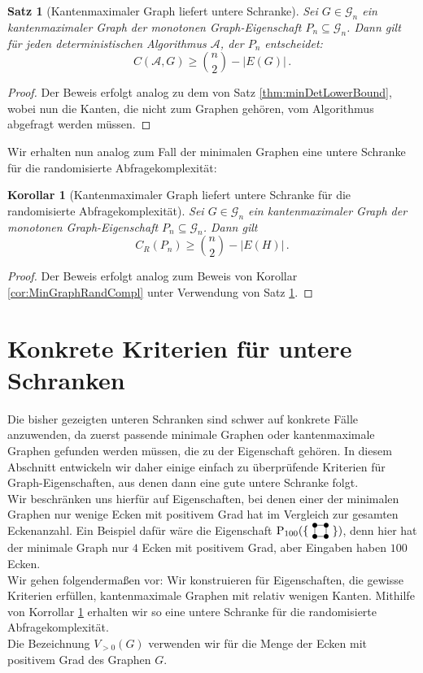 \documentclass[10pt,a4paper]{scrreprt}
\newtheorem{Satz}[definition]{Satz}
\newtheorem{corollary}[definition]{Korollar}
\theoremstyle{definition}
\newcommand{\Square}{
\begin{tikzpicture}[main_node/.style={circle,fill=black},
inner sep=1.5pt, baseline=2pt]

    \node[main_node] (1) at (0,0) {};
    \node[main_node] (2) at (0.35, 0)  {};
    \node[main_node] (3) at (0.35, 0.35) {};
    \node[main_node] (4) at (0, 0.35) {};

    \draw (1) -- (2) -- (3) -- (4) -- (1);
\end{tikzpicture}
}
\begin{document}
\begin{Satz}[Kantenmaximaler Graph liefert untere Schranke]
\label{thm:EdgeMaxGraphLowerBound}
Sei $G\in \mathcal{G}_n$ ein kantenmaximaler Graph der monotonen
Graph-Eigenschaft $P_n \subseteq \mathcal{G}_n$.
Dann gilt für jeden deterministischen Algorithmus $\mathcal{A}$,
der $P_n$ entscheidet: 
$$ C(\mathcal{A}, G) \geq \binom{n}{2} - |E(G)|\,.$$
\end{Satz}
\begin{proof}
Der Beweis erfolgt analog zu dem von Satz \ref{thm:minDetLowerBound},
wobei nun die Kanten, die nicht zum Graphen gehören, vom Algorithmus
abgefragt werden müssen.
\end{proof}
Wir erhalten nun analog zum Fall der minimalen Graphen eine untere
Schranke für die randomisierte Abfragekomplexität:
\begin{corollary} [Kantenmaximaler Graph liefert untere Schranke
für die randomisierte Abfragekomplexität]
\label{thm:EdgeMaximalRandCompl}
Sei $G\in\mathcal{G}_n$ ein kantenmaximaler Graph der monotonen
Graph-Eigenschaft $P_n \subseteq \mathcal{G}_n$.
Dann gilt
$$ C_R(P_n) \geq \binom{n}{2} - |E(H)|\,.$$
\end{corollary}
\begin{proof}
Der Beweis erfolgt analog zum Beweis von Korollar \ref{cor:MinGraphRandCompl}
unter Verwendung von Satz \ref{thm:EdgeMaxGraphLowerBound}.
\end{proof}

\section{Konkrete Kriterien für untere Schranken}
Die bisher gezeigten unteren Schranken sind schwer auf konkrete
Fälle anzuwenden, da zuerst passende minimale Graphen oder kantenmaximale
Graphen gefunden werden müssen, die zu der Eigenschaft gehören.
In diesem Abschnitt entwickeln wir daher einige einfach zu überprüfende
Kriterien für Graph-Eigenschaften, aus denen dann eine gute
untere Schranke folgt. \\
Wir beschränken uns hierfür auf Eigenschaften, bei denen einer
der minimalen Graphen nur wenige Ecken mit positivem Grad hat
im Vergleich zur gesamten Eckenanzahl. Ein Beispiel dafür wäre
die Eigenschaft $\operatorname{P}_{100}(\{ \ \Square \ \})$,
denn hier hat der minimale Graph nur $4$ Ecken mit positivem
Grad, aber Eingaben haben $100$ Ecken. \\
Wir gehen folgendermaßen vor: Wir konstruieren für Eigenschaften,
die gewisse Kriterien erfüllen, kantenmaximale Graphen mit 
relativ wenigen Kanten. Mithilfe von Korrollar 
\ref{thm:EdgeMaximalRandCompl} erhalten wir so eine untere Schranke
für die randomisierte Abfragekomplexität. \\
Die Bezeichnung $V_{>0}(G)$ verwenden wir für die
Menge der Ecken mit positivem Grad des Graphen $G$.
\end{document}
